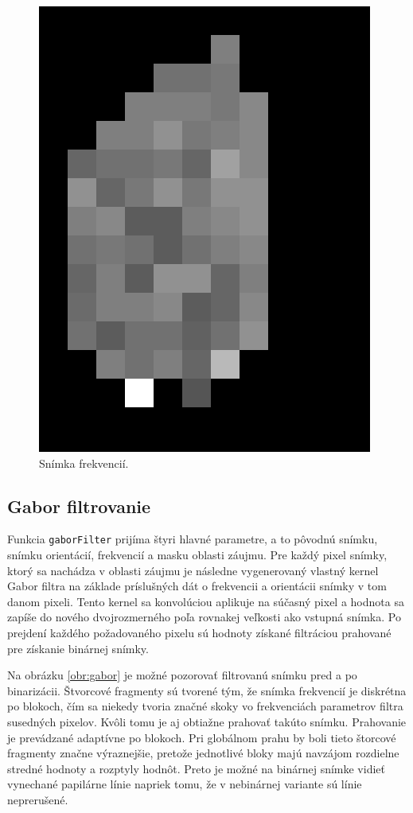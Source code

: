   \begin{figure}[h]
    \centering
    \includegraphics[width=0.3\linewidth]{obrazky-figures/freqim.png}
    \caption{Snímka frekvencií.}
    \label{obr:frekvencie}
  \end{figure}

  \subsection{Gabor filtrovanie}
  Funkcia \texttt{gaborFilter} prijíma štyri hlavné parametre, a to pôvodnú snímku, snímku orientácií, frekvencií a masku oblasti záujmu. Pre každý pixel
  snímky, ktorý sa nachádza v oblasti záujmu je následne vygenerovaný vlastný kernel Gabor filtra na základe príslušných dát o frekvencii a orientácii
  snímky v tom danom pixeli. Tento kernel sa konvolúciou aplikuje na súčasný pixel a hodnota sa zapíše do nového dvojrozmerného poľa rovnakej veľkosti ako
  vstupná snímka. Po prejdení každého požadovaného pixelu sú hodnoty získané filtráciou prahované pre získanie binárnej snímky.

  Na obrázku \ref{obr:gabor}
  je možné pozorovať filtrovanú snímku pred a po binarizácii. Štvorcové fragmenty sú tvorené tým, že snímka frekvencií je diskrétna po blokoch,
  čím sa niekedy tvoria značné skoky vo frekvenciách parametrov filtra susedných pixelov. Kvôli tomu je aj obtiažne prahovať takúto snímku. Prahovanie
  je prevádzané adaptívne po blokoch. Pri globálnom prahu by boli tieto štorcové fragmenty značne výraznejšie, pretože jednotlivé bloky majú navzájom
  rozdielne stredné hodnoty a rozptyly hodnôt. Preto je možné na binárnej snímke vidieť vynechané papilárne línie napriek
  tomu, že v nebinárnej variante sú línie neprerušené.

